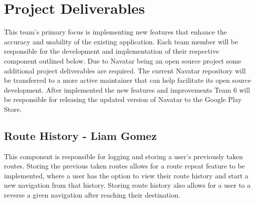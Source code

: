 \documentclass{scrreprt}
\begin{document}
\chapter{Project Deliverables}
This team’s primary focus is implementing new features that enhance the accuracy and usability of the existing application. Each team member will be responsible for the development and implementation of their respective component outlined below. Due to Navatar being an open source project some additional project deliverables are required. The current Navatar repository will be transferred to a more active maintainer that can help facilitate its open source development. After implemented the new features and improvements Team 6 will be responsible for releasing the updated version of Navatar to the Google Play Store.


\section{Route History - Liam Gomez}
This component is responsible for logging and storing a user’s previously taken routes. Storing the previous taken routes allows for a route repeat feature to be implemented, where a user has the option to view their route history and start a new navigation from that history. Storing route history also allows for a user to a reverse a given navigation after reaching their destination.
\end{document}
